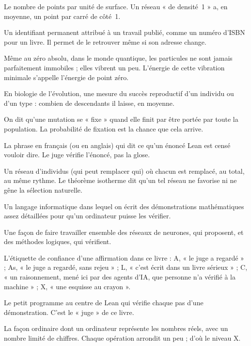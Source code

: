\begin{description}[style=nextline,leftmargin=0pt,font=\normalfont\sffamily\bfseries\color{okbleu},itemsep=5pt]
\item[Densité] Le nombre de points par unité de surface. Un réseau « de densité~1 » a, en moyenne, un point par carré
de côté~1.
\item[DOI] Un identifiant permanent attribué à un travail publié, comme un numéro d'ISBN pour un livre. Il permet de
le retrouver même si son adresse change.
\item[Énergie de point zéro] Même au zéro absolu, dans le monde quantique, les particules ne sont jamais parfaitement
immobiles ; elles vibrent un peu. L'énergie de cette vibration minimale s'appelle l'énergie de point zéro.
\item[Fitness] En biologie de l'évolution, une mesure du succès reproductif d'un individu ou d'un type : combien de
descendants il laisse, en moyenne.
\item[Fixation] On dit qu'une mutation se « fixe » quand elle finit par être portée par toute la population. La
probabilité de fixation est la chance que cela arrive.
\item[Glose] La phrase en français (ou en anglais) qui dit ce qu'un énoncé Lean est censé vouloir dire. Le juge
vérifie l'énoncé, pas la glose.
\item[Graphe isotherme] Un réseau d'individus (qui peut remplacer qui) où chacun est remplacé, au total, au même
rythme. Le théorème isotherme dit qu'un tel réseau ne favorise ni ne gêne la sélection naturelle.
\item[Lean] Un langage informatique dans lequel on écrit des démonstrations mathématiques assez détaillées pour qu'un
ordinateur puisse les vérifier.
\item[Neuro-symbolique] Une façon de faire travailler ensemble des réseaux de neurones, qui proposent, et des méthodes
logiques, qui vérifient.
\item[Niveau (A, As, L, C, X)] L'étiquette de confiance d'une affirmation dans ce livre : A, « le juge a regardé » ;
As, « le juge a regardé, sans rejeu » ; L,
« c'est écrit dans un livre sérieux » ; C, « un raisonnement, mené ici par des agents d'IA, que personne n'a vérifié à la machine » ; X, « une
esquisse au crayon ».
\item[Noyau] Le petit programme au centre de Lean qui vérifie chaque pas d'une démonstration. C'est le « juge » de ce
livre.
\item[Nombre à virgule (flottante)] La façon ordinaire dont un ordinateur représente les nombres réels, avec un
nombre limité de chiffres. Chaque opération arrondit un peu ; d'où le niveau X.

\end{description}
